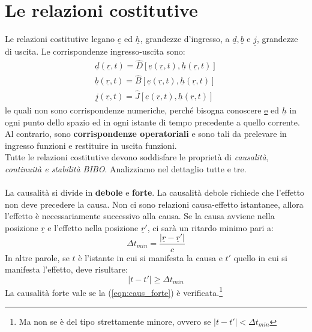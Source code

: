 \documentclass{book}
\begin{document}
        \section{Le relazioni costitutive}
            Le relazioni costitutive legano $\underline{e}$ ed $\underline{h}$, grandezze d'ingresso, a $\underline{d},\underline{b}$ e $\underline{j}$, grandezze di uscita. Le corrispondenze ingresso-uscita sono:
            \begin{align}
                \underline{d} (\underline{r}, t) = \hat{D}[\underline{e}(\underline{r}, t), \underline{h}(\underline{r}, t)] \\
                \underline{b} (\underline{r}, t) = \hat{B}[\underline{e}(\underline{r}, t), \underline{h}(\underline{r}, t)] \\
                \underline{j} (\underline{r}, t) = \hat{J}[\underline{e}(\underline{r}, t), \underline{h}(\underline{r}, t)] 
            \end{align}
            le quali non sono corrispondenze numeriche, perché bisogna conoscere \underline{e} ed $\underline{h}$ in ogni punto dello spazio ed in ogni istante di tempo precedente a quello corrente. Al contrario, sono \textbf{corrispondenze operatoriali} e sono tali da prelevare in ingresso funzioni e restituire in uscita funzioni. \\
            Tutte le relazioni costitutive devono soddisfare le proprietà di \textit{causalità, continuità e stabilità BIBO}. Analizziamo nel dettaglio tutte e tre. \\ \\
            La causalità si divide in \textbf{debole} e \textbf{forte}. La causalità debole richiede che l'effetto non deve precedere la causa. Non ci sono relazioni causa-effetto istantanee, allora l'effetto è necessariamente successivo alla causa. Se la causa avviene nella posizione $\underline{r}$ e l'effetto nella posizione $\underline{r}'$, ci sarà un ritardo minimo pari a:
            \begin{equation}
                \Delta t_{min} = \frac{|\underline{r}-\underline{r}'|}{c}
            \end{equation}
            In altre parole, se $t$ è l'istante in cui si manifesta la causa e $t'$ quello in cui si manifesta l'effetto, deve risultare:
            \begin{equation}
            \label{eqn:caus_forte}
                |t-t'| \geq \Delta t_{min}
            \end{equation}
            La causalità forte vale se la (\ref{eqn:caus_forte}) è verificata.\footnote{Ma non se è del tipo strettamente minore, ovvero se $|t-t'|< \Delta t_{min}$}\\
\end{document}
